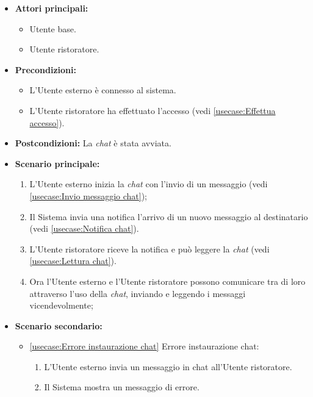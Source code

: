 \label{usecase:Chat Utente esterno}
\begin{itemize}
	\item \textbf{Attori principali:} 
	\begin{itemize}
        \item Utente base.
        \item Utente ristoratore.
    \end{itemize}

	\item \textbf{Precondizioni:}
	\begin{itemize}
        \item L'Utente esterno è connesso al sistema.
        \item L'Utente ristoratore ha effettuato l'accesso (vedi \autoref{usecase:Effettua accesso}).
    \end{itemize}

	\item \textbf{Postcondizioni:} La \textit{chat} è stata avviata.

	\item \textbf{Scenario principale:}
            \begin{enumerate}
                \item L'Utente esterno inizia la \textit{chat} con l'invio di un messaggio (vedi \autoref{usecase:Invio messaggio chat});
                \item Il Sistema invia una notifica l'arrivo di un nuovo messaggio al destinatario (vedi \autoref{usecase:Notifica chat}).
                \item L'Utente ristoratore riceve la notifica e può leggere la \textit{chat} (vedi \autoref{usecase:Lettura chat}).
                \item Ora l'Utente esterno e l'Utente ristoratore possono comunicare tra di loro attraverso l'uso della \textit{chat}, inviando e leggendo i messaggi vicendevolmente;
	      \end{enumerate}

    \item \textbf{Scenario secondario:}
		  \begin{itemize}
			  \item \autoref{usecase:Errore instaurazione chat} Errore instaurazione chat:
				\begin{enumerate}
					\item L'Utente esterno invia un messaggio in chat all'Utente ristoratore.
					\item  Il Sistema mostra un messaggio di errore.
				\end{enumerate}
		  \end{itemize}
\end{itemize}
